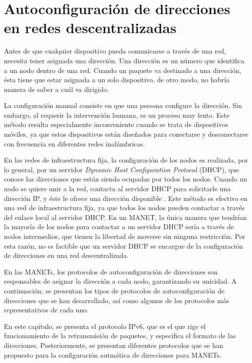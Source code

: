 ﻿\chapter{Autoconfiguración de direcciones en redes descentralizadas}
\label{ch:autoconfiguracion_de_direcciones_en_redes_descentralizadas}

Antes de que cualquier dispositivo pueda comunicarse a través de una red,
necesita tener asignada una dirección. Una dirección es un número que identifica
a un nodo dentro de una red. Cuando un paquete va destinado a una dirección,
ésta tiene que estar asignada a un solo dispositivo, de otro modo, no habría
manera de saber a cuál va dirigido.

La configuración manual consiste en que una persona configure la dirección.
Sin embargo, al requerir la intervención humana, es un proceso muy lento.
Este método resulta especialmente inconveniente cuando se trata de dispositivos
móviles, ya que estos dispositivos están diseñados para conectarse y
desconectarse con frecuencia en diferentes redes inalámbricas.

En las redes de infraestructura fija, la configuración de los nodos es
realizada, por lo general, por un servidor \textit{Dynamic Host Configuration
Protocol} (DHCP), que conoce las direcciones que están siendo ocupadas por todos
los nodos. Cuando un nodo se quiere unir a la red, contacta al servidor DHCP para
solicitarle una dirección IP, y éste le ofrece una dirección disponible
\cite{Kurose2013}. Este método es efectivo en una red de infraestructura fija,
ya que todos los nodos pueden contactar a través del enlace local al servidor
DHCP. En un MANET, la única manera que tendrían la mayoría de los nodos para
contactar a un servidor DHCP sería a través de nodos intermedios, que tienen la
libertad de moverse sin ninguna restricción. Por esta razón, no es factible que
un servidor DHCP se encargue de la configuración de direcciones en una red
descentralizada.

En las MANETs, los protocolos de autoconfiguración de direcciones son
responsables de asignar la dirección a cada nodo, garantizando su unicidad. A
continuación, se presentan los tipos de protocolos de autoconfiguración de
direcciones que se han desarrollado, así como algunos de los protocolos más
representativos de cada uno.

En este capítulo, se presenta el protocolo IPv6, que es el que rige el
funcionamiento de la retransmisión de paquetes, y especifica el formato de las
direcciones. Posteriormente, se presentan diferentes protocolos que se han
propuesto para la configuración autmática de direcciones para MANETs.

